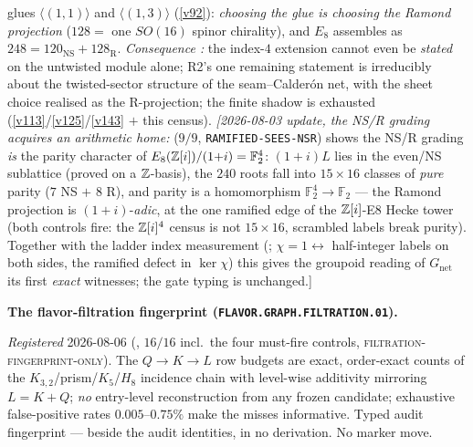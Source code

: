 glues $\langle(1,1)\rangle$ and $\langle(1,3)\rangle$ (\vref{v92}): \emph{choosing the glue is choosing
the Ramond projection} ($128=$ one $SO(16)$ spinor chirality), and $E_8$ assembles as
$248=120_{\mathrm{NS}}+128_{\mathrm R}$. \emph{Consequence \mC:} the index-$4$ extension cannot even be
\emph{stated} on the untwisted module alone; R2's one remaining statement is irreducibly about the
twisted-sector structure of the seam--Calder\'on net, with the sheet choice realised as the R-projection;
the finite shadow is exhausted (\vref{v113}/\vref{v125}/\vref{v143} $+$ this census).
\emph{[2026-08-03 update, the NS/R grading acquires an arithmetic
home:}  ($9/9$,
\texttt{RAMIFIED-SEES-NSR}) shows the NS/R grading \emph{is} the
parity character of $E_8(\mathbb Z[i])/(1{+}i)=\mathbb F_2^4$: $(1{+}i)L$
lies in the even/NS sublattice (proved on a $\mathbb Z$-basis), the $240$
roots fall into $15\times16$ classes of \emph{pure} parity ($7$ NS
$+$ $8$ R), and parity is a homomorphism $\mathbb
F_2^4\to\mathbb F_2$ --- the Ramond projection is
$(1{+}i)$-\emph{adic}, at the one ramified edge of the
$\mathbb Z[i]$-E8 Hecke tower (both controls fire: the $\mathbb Z[i]^4$ census is
not $15\times16$, scrambled labels break purity).  Together with
the ladder index measurement (;
$\chi=1\leftrightarrow$ half-integer labels on both sides, the
ramified defect in $\ker\chi$) this gives the groupoid reading of
$G_{\mathrm{net}}$ its first \emph{exact} witnesses; the gate
typing is unchanged.]

\par\smallskip\noindent\textbf{The flavor-filtration fingerprint
(\texttt{FLAVOR.GRAPH.FILTRATION.01}).}
{\sloppy
\emph{Registered} 2026-08-06
(, $16/16$ incl.\ the
four must-fire controls, \textsc{filtration-fingerprint-only}).
The $Q\to K\to L$ row budgets are exact, order-exact counts of
the $K_{3,2}$/prism/$K_5$/$H_8$ incidence chain with level-wise
additivity mirroring $L=K+Q$; \emph{no} entry-level
reconstruction from any frozen candidate; exhaustive
false-positive rates $0.005$--$0.75\%$ make the misses
informative.  Typed audit fingerprint --- beside the audit
identities, in no derivation.  No marker move.\par}

